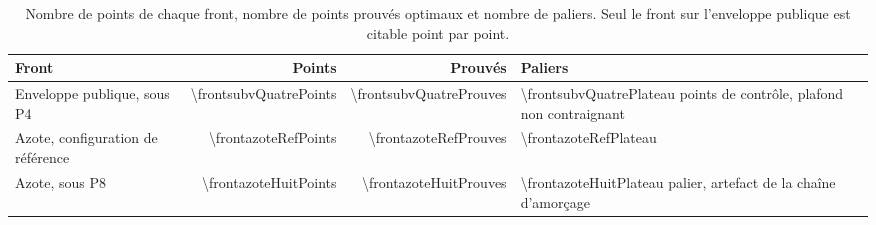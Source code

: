 \begin{table}[H]
  \centering
  \caption{Nombre de points de chaque front, nombre de points prouvés optimaux et nombre de
  paliers. Seul le front sur l'enveloppe publique est citable point par point.}
  \label{tab:ann-fronts-statut}
  \small
  \begin{tabularx}{\textwidth}{@{}>{\raggedright\arraybackslash}Xrrl@{}}
    \toprule
    \textbf{Front} & \textbf{Points} & \textbf{Prouvés} & \textbf{Paliers} \\
    \midrule
    Enveloppe publique, sous P4 & \num{\frontsubvQuatrePoints}
      & \num{\frontsubvQuatreProuves}
      & \num{\frontsubvQuatrePlateau} points de contrôle, plafond non contraignant \\
    Azote, configuration de référence & \num{\frontazoteRefPoints}
      & \num{\frontazoteRefProuves} & \num{\frontazoteRefPlateau} \\
    Azote, sous P8 & \num{\frontazoteHuitPoints} & \num{\frontazoteHuitProuves}
      & \num{\frontazoteHuitPlateau} palier, artefact de la chaîne d'amorçage \\
    \bottomrule
  \end{tabularx}
\end{table}

\begin{table}[H]
  \centering
  \caption{Réallocation entre le statu quo à enveloppe libre et le plafond de subventions le
  plus serré (\SI{\frontsubvQuatreunSeuil}{\euros}), en hectares par groupe \gls{rpg}.}
  \label{tab:ann-realloc}
  \small
  
\end{table}

\begin{table}[H]
  \centering
  \caption{Front marge $\times$ azote sous la configuration de référence, point par point.
  Pente moyenne \num{\frontazoteRefPente}~\eur/kg~N, dual local au point le plus serré
  \num{\frontazoteRefDualBas}~\eur/kg~N.}
  \label{tab:ann-front-azote-ref}
  \small
  
\end{table}

\begin{table}[H]
  \centering
  \caption{Front marge $\times$ azote sous la politique agroécologique P8, point par point.
  Pente moyenne \num{\frontazoteHuitPente}~\eur/kg~N, dual local au point le plus serré
  \num{\frontazoteHuitDualBas}~\eur/kg~N.}
  \label{tab:ann-front-azote-huit}
  \small
  
\end{table}

